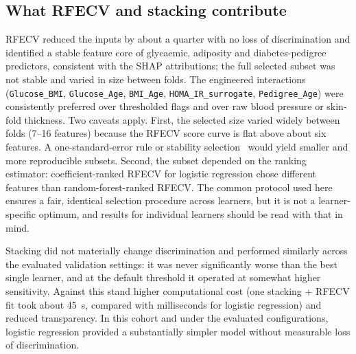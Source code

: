 \subsection{What RFECV and stacking contribute}
RFECV reduced the inputs by about a quarter with no loss of discrimination and identified a stable feature core of glycaemic, adiposity and diabetes-pedigree predictors, consistent with the SHAP attributions; the full selected subset was not stable and varied in size between folds. The engineered interactions (\texttt{Glucose\_BMI}, \texttt{Glucose\_Age}, \texttt{BMI\_Age}, \texttt{HOMA\_IR\_surrogate}, \texttt{Pedigree\_Age}) were consistently preferred over thresholded flags and over raw blood pressure or skin-fold thickness. Two caveats apply. First, the selected size varied widely between folds (7--16 features) because the RFECV score curve is flat above about six features. A one-standard-error rule or stability selection~\cite{meinshausen2010stability} would yield smaller and more reproducible subsets. Second, the subset depended on the ranking estimator: coefficient-ranked RFECV for logistic regression chose different features than random-forest-ranked RFECV. The common protocol used here ensures a fair, identical selection procedure across learners, but it is not a learner-specific optimum, and results for individual learners should be read with that in mind.

Stacking did not materially change discrimination and performed similarly across the evaluated validation settings: it was never significantly worse than the best single learner, and at the default threshold it operated at somewhat higher sensitivity. Against this stand higher computational cost (one stacking + RFECV fit took about 45~s, compared with milliseconds for logistic regression) and reduced transparency. In this cohort and under the evaluated configurations, logistic regression provided a substantially simpler model without measurable loss of discrimination.

